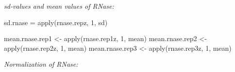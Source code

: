 \documentclass[
]{article}
\newenvironment{Shaded}{\begin{snugshade}}{\end{snugshade}}
\newcommand{\DecValTok}[1]{\textcolor[rgb]{0.00,0.00,0.81}{#1}}
\newcommand{\FunctionTok}[1]{\textcolor[rgb]{0.00,0.00,0.00}{#1}}
\newcommand{\NormalTok}[1]{#1}
\newcommand{\OtherTok}[1]{\textcolor[rgb]{0.56,0.35,0.01}{#1}}
\begin{document}
\emph{sd-values and mean values of RNase:}

\begin{Shaded}
\begin{Highlighting}[]
\NormalTok{sd.rnase }\OtherTok{=} \FunctionTok{apply}\NormalTok{(rnase.repz, }\DecValTok{1}\NormalTok{, sd)}

\NormalTok{mean.rnase.rep1 }\OtherTok{\textless{}{-}} \FunctionTok{apply}\NormalTok{(rnase.rep1z, }\DecValTok{1}\NormalTok{, mean)}
\NormalTok{mean.rnase.rep2 }\OtherTok{\textless{}{-}} \FunctionTok{apply}\NormalTok{(rnase.rep2z, }\DecValTok{1}\NormalTok{, mean)}
\NormalTok{mean.rnase.rep3 }\OtherTok{\textless{}{-}} \FunctionTok{apply}\NormalTok{(rnase.rep3z, }\DecValTok{1}\NormalTok{, mean)}
\end{Highlighting}
\end{Shaded}

\emph{Normalization of RNase:}
\end{document}
